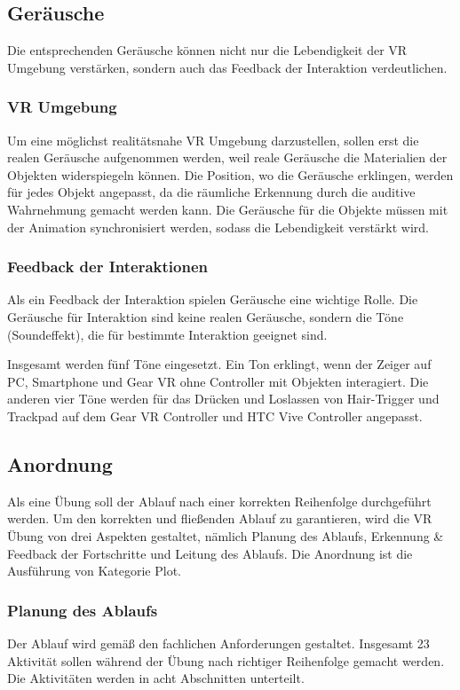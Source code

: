  \subsection{Geräusche}
 Die entsprechenden Geräusche können nicht nur die Lebendigkeit der VR Umgebung verstärken, sondern auch das Feedback der Interaktion verdeutlichen.
 \subsubsection{VR Umgebung}
 Um eine möglichst realitätsnahe VR Umgebung darzustellen, sollen erst die realen Geräusche aufgenommen werden, weil reale Geräusche die Materialien der Objekten widerspiegeln können. Die Position, wo die Geräusche erklingen, werden für jedes Objekt angepasst, da die räumliche Erkennung durch die auditive Wahrnehmung gemacht werden kann. Die Geräusche für die Objekte müssen mit der Animation synchronisiert werden, sodass die Lebendigkeit verstärkt wird.
 
 \subsubsection{Feedback der Interaktionen}
 Als ein Feedback der Interaktion spielen Geräusche eine wichtige Rolle. Die Geräusche für Interaktion sind keine realen Geräusche, sondern die Töne (Soundeffekt), die für bestimmte Interaktion geeignet sind.
 
 Insgesamt werden fünf Töne eingesetzt. Ein Ton erklingt, wenn der Zeiger auf PC, Smartphone und Gear VR ohne Controller mit Objekten interagiert. Die anderen vier Töne werden für das Drücken und Loslassen von Hair-Trigger und Trackpad auf dem Gear VR Controller und HTC Vive Controller angepasst.
 
 \subsection{Anordnung}
 Als eine Übung soll der Ablauf nach einer korrekten Reihenfolge durchgeführt werden. Um den korrekten und fließenden Ablauf zu garantieren, wird die VR Übung von drei Aspekten gestaltet, nämlich Planung des Ablaufs, Erkennung \& Feedback der Fortschritte und Leitung des Ablaufs. Die Anordnung ist die Ausführung von Kategorie \glqq Plot\grqq.
  \subsubsection{Planung des Ablaufs}
      
  Der Ablauf wird gemäß den fachlichen Anforderungen gestaltet. Insgesamt 23 Aktivität sollen während der Übung nach richtiger Reihenfolge gemacht werden. Die Aktivitäten werden in acht Abschnitten unterteilt.
  
